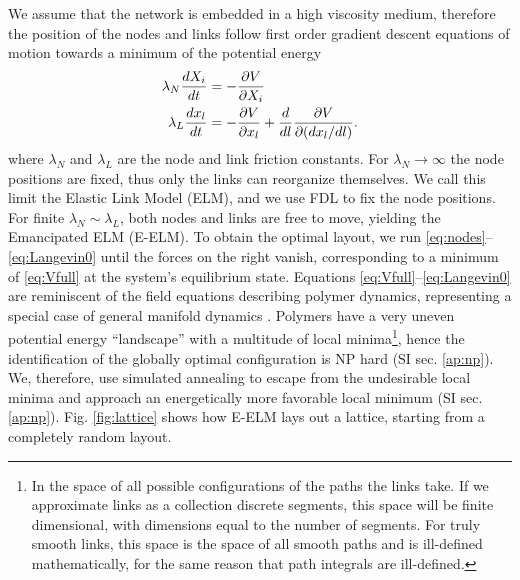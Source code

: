 \documentclass[nofootinbib,preprint,floatfix,titlepage,endfloats]{revtex4} %
\begin{document}
We assume that the network is embedded in a high viscosity medium, therefore the position of the nodes and links follow first order gradient descent equations of motion towards a minimum of the potential energy
\begin{align}
    \lambda_N {dX_i\over dt} &= -{\ro V \over \ro X_i} %
    \label{eq:nodes}\\
    \lambda_L {dx_l \over dt} & =  -{\ro V \over \ro x_l} + {d\over dl} {\ro V \over \ro (dx_l /dl)}   \label{eq:Langevin0}.
\end{align}
where $\lambda_N$ and $\lambda_L$ are the node and link friction constants. 
For $\lambda_N\to \infty$ the node positions are fixed, thus only the links can reorganize themselves. 
We call this limit the Elastic Link Model (ELM), and we use FDL to fix the node positions.
For finite $\lambda_N \sim \lambda_L$, both nodes and links are free to move, yielding the Emancipated ELM (E-ELM). To obtain the optimal layout, we run  \eqref{eq:nodes}--\eqref{eq:Langevin0} until the forces on the right 
vanish, corresponding to a minimum of \eqref{eq:Vfull} at the system's equilibrium state. 
Equations \eqref{eq:Vfull}--\eqref{eq:Langevin0} are reminiscent of the field equations describing polymer dynamics, representing a special case of general manifold dynamics \cite{mezard1991replica}. 
Polymers have a very uneven potential energy ``landscape'' \cite{parisi2002physical} with a multitude of local minima\footnote{In the space of all possible configurations of the paths the links take.
If we approximate links as a collection discrete segments, this space will be finite dimensional, with dimensions equal to the number of segments. 
For truly smooth links, this space is the space of all smooth paths and is ill-defined mathematically, for the same reason that path integrals are ill-defined.}, hence the identification of the globally optimal configuration is NP hard (SI sec. \ref{ap:np}).
We, therefore, use simulated annealing \cite{hwang1988simulated} to escape from the undesirable local minima and approach an energetically more favorable local minimum (SI sec. \ref{ap:np}). 
Fig. \ref{fig:lattice} shows how E-ELM lays out a lattice, starting from a completely random layout. 
\end{document}

